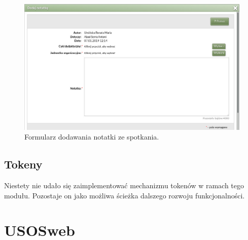 \documentclass[licencjacka]{pracamgr}
\begin{document}
\begin{figure}[!]
  \includegraphics[width=\linewidth]{formularz_notatek.jpg}
  \caption{Formularz dodawania notatki ze spotkania.}
  \label{fig:formularz_notatek}
\end{figure}

\subsection{Tokeny}
Niestety nie udało się zaimplementować mechanizmu tokenów w ramach tego modułu. Pozostaje on jako możliwa ścieżka dalszego rozwoju funkcjonalności.

\section{USOSweb} \label{sec:impusosweb}
\end{document}
